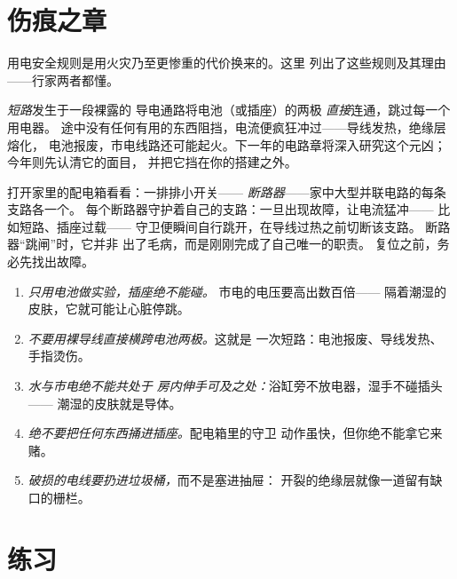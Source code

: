 \section{伤痕之章}

用电安全规则是用火灾乃至更惨重的代价换来的。这里
列出了这些规则及其理由——行家两者都懂。

\begin{definition}[短路]\label{def:g6:circuits-and-safety:short}
\emph{短路}发生于一段裸露的
导电通路将电池（或插座）的两极
\emph{直接}连通，跳过每一个用电器。
途中没有任何有用的东西阻挡，电流便疯狂冲过——导线发热，绝缘层熔化，
电池报废，市电线路还可能起火。下一年的电路章将深入研究这个元凶；
今年则先认清它的面目，
并把它挡在你的搭建之外。
\end{definition}

\begin{remark}[家中的守卫]\label{rem:g6:circuits-and-safety:guards}
打开家里的配电箱看看：一排排小开关——
\emph{断路器}——家中大型并联电路的每条支路各一个。
每个断路器守护着自己的支路：一旦出现故障，让电流猛冲——
比如短路、插座过载——
守卫便瞬间自行跳开，在导线过热之前切断该支路。
断路器“跳闸”时，它并非
出了毛病，而是刚刚完成了自己唯一的职责。
复位之前，务必先找出故障。
\end{remark}

\begin{remark}[规则及其理由]\label{rem:g6:circuits-and-safety:rules}
\begin{enumerate}
  \item \emph{只用电池做实验，插座绝不能碰。}
        市电的电压要高出数百倍——
        隔着潮湿的皮肤，它就可能让心脏停跳。
  \item \emph{不要用裸导线直接横跨电池两极。}这就是
        一次短路：电池报废、导线发热、手指烫伤。
  \item \emph{水与市电绝不能共处于
        房内伸手可及之处：}浴缸旁不放电器，湿手不碰插头——
        潮湿的皮肤就是导体。
  \item \emph{绝不要把任何东西捅进插座。}配电箱里的守卫
        动作虽快，但你绝不能拿它来赌。
  \item \emph{破损的电线要扔进垃圾桶，}而不是塞进抽屉：
        开裂的绝缘层就像一道留有缺口的栅栏。
\end{enumerate}
\end{remark}

\section{练习}

